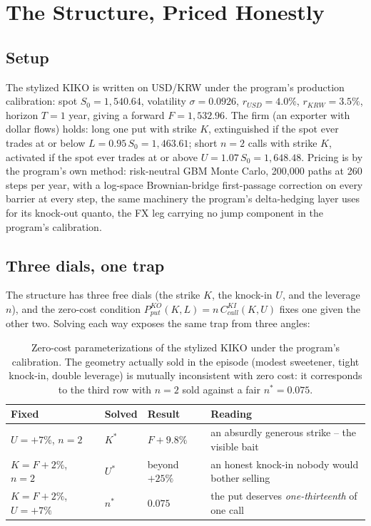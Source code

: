 \documentclass[11pt,a4paper]{article}
\begin{document}
\section{The Structure, Priced Honestly}
\label{sec:pricing}

\subsection{Setup}

The stylized KIKO is written on USD/KRW under the program's production calibration: spot $S_0=1{,}540.64$, volatility $\sigma=0.0926$, $r_{USD}=4.0\%$, $r_{KRW}=3.5\%$, horizon $T=1$ year, giving a forward $F=1{,}532.96$. The firm (an exporter with dollar flows) holds: long one put with strike $K$, extinguished if the spot ever trades at or below $L=0.95\,S_0=1{,}463.61$; short $n=2$ calls with strike $K$, activated if the spot ever trades at or above $U=1.07\,S_0=1{,}648.48$. Pricing is by the program's own method: risk-neutral GBM Monte Carlo, 200{,}000 paths at 260 steps per year, with a log-space Brownian-bridge first-passage correction on every barrier at every step, the same machinery the program's delta-hedging layer uses for its knock-out quanto, the FX leg carrying no jump component in the program's calibration.

\subsection{Three dials, one trap}

The structure has three free dials (the strike $K$, the knock-in $U$, and the leverage $n$), and the zero-cost condition $P_{put}^{KO}(K,L)=n\,C_{call}^{KI}(K,U)$ fixes one given the other two. Solving each way exposes the same trap from three angles:

\begin{table}[h]
\centering
\small
\begin{tabular}{llll}
\toprule
Fixed & Solved & Result & Reading \\
\midrule
$U=+7\%$, $n=2$ & $K^{*}$ & $F+9.8\%$ & an absurdly generous strike -- the visible bait \\
$K=F+2\%$, $n=2$ & $U^{*}$ & beyond $+25\%$ & an honest knock-in nobody would bother selling \\
$K=F+2\%$, $U=+7\%$ & $n^{*}$ & $0.075$ & the put deserves \emph{one-thirteenth} of one call \\
\bottomrule
\end{tabular}
\caption{Zero-cost parameterizations of the stylized KIKO under the program's calibration. The geometry actually sold in the episode (modest sweetener, tight knock-in, double leverage) is mutually inconsistent with zero cost: it corresponds to the third row with $n=2$ sold against a fair $n^{*}=0.075$.}
\label{tab:dials}
\end{table}
\end{document}
